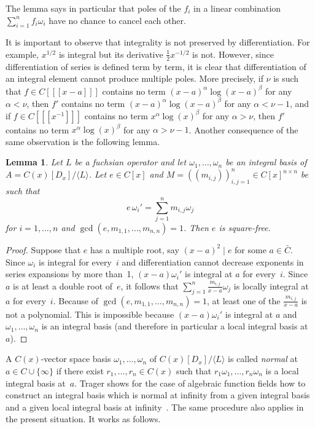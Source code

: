 \documentclass{sig-alternate}
\newtheorem{lemma}[theorem]{Lemma}
\def\<#1>{\langle#1\rangle}
\begin{document}
The lemma says in particular that poles of the $f_i$ in a linear combination
$\sum_{i=1}^n f_i\omega_i$ have no chance to cancel each other.

It is important to observe that integrality is not preserved by differentiation.
For example, $x^{1/2}$ is integral but its derivative $\tfrac12 x^{-1/2}$ is
not. However, since differentiation of series is defined term by term, it is
clear that differentiation of an integral element cannot produce multiple
poles. More precisely, if $\nu$ is such that $f\in C[[[x-a]]]$ contains no term
$(x-a)^\alpha\log(x-a)^\beta$ for any $\alpha<\nu$, then $f'$ contains no term
$(x-a)^\alpha\log(x-a)^\beta$ for any $\alpha<\nu-1$, and if $f\in
C[[[x^{-1}]]]$ contains no term $x^\alpha\log(x)^\beta$ for any $\alpha>\nu$,
then $f'$ contains no term $x^\alpha\log(x)^\beta$ for any
$\alpha>\nu-1$. Another consequence of the same observation is the following
lemma.

\begin{lemma}\label{lemma:e}
  Let $L$ be a fuchsian operator and let
  $\omega_1,\dots,\omega_n$ be an integral basis of $A=C(x)[D_x]/\<L>$.
  Let $e\in C[x]$ and
  $M=((m_{i,j}))_{i,j=1}^n\in C[x]^{n\times n}$ be such that
  \[
    e\,\omega_i'=\sum_{j=1}^n m_{i,j}\omega_j
  \]
  for $i=1,\dots,n$ and $\gcd(e,m_{1,1},\dots,m_{n,n})=1$.
  Then $e$ is square-free.
\end{lemma}
\begin{proof}
  Suppose that $e$ has a multiple root, say $(x-a)^2\mid e$ for some $a\in\bar
  C$. Since $\omega_i$ is integral for every~$i$ and differentiation cannot
  decrease exponents in series expansions by more than~1, $(x-a)\omega_i'$ is
  integral at $a$ for every~$i$.  Since $a$ is at least a double root of~$e$, it
  follows that $\sum_{j=1}^n\frac{m_{i,j}}{x-a}\omega_j$ is locally integral
  at~$a$ for every~$i$.  Because of $\gcd(e,m_{1,1},\dots,m_{n,n})=1$, at least
  one of the $\frac{m_{i,j}}{x-a}$ is not a polynomial.  This is impossible
  because $(x-a)\omega_i'$ is integral at $a$ and $\omega_1,\dots,\omega_n$ is
  an integral basis (and therefore in particular a local integral basis at~$a$).
\end{proof}

A $C(x)$-vector space basis $\omega_1,\dots,\omega_n$ of $C(x)[D_x]/\<L>$ is
called \emph{normal} at $a\in C\cup\{\infty\}$ if there exist $r_1,\dots,r_n\in
C(x)$ such that $r_1\omega_1,\dots,r_n\omega_n$ is a local integral basis
at~$a$. Trager shows for the case of algebraic function fields how to construct
an integral basis which is normal at infinity from a given integral basis and
a given local integral basis at infinity~\cite{trager84}. The same procedure also applies
in the present situation. It works as follows.
\end{document}
